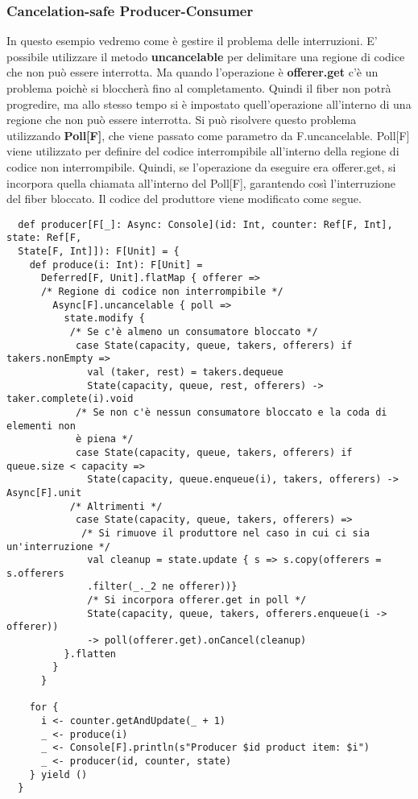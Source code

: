 \subsubsection{Cancelation-safe Producer-Consumer}
In questo esempio vedremo come è gestire il problema delle interruzioni. E' possibile utilizzare il metodo \textbf{uncancelable} per delimitare una regione di codice che non può essere interrotta. Ma quando l’operazione è \textbf{offerer.get} c’è un problema poichè si bloccherà fino al completamento. Quindi il fiber non potrà progredire, ma allo stesso tempo si è impostato quell’operazione all’interno di una regione che non può essere interrotta. Si può risolvere questo problema utilizzando \textbf{Poll[F]}, che viene passato come parametro da F.uncancelable. Poll[F] viene utilizzato per definire del codice interrompibile all’interno della regione di codice non interrompibile. Quindi, se l’operazione da
eseguire era offerer.get, si incorpora quella chiamata all’interno del Poll[F], garantendo così l’interruzione del fiber bloccato. Il codice del produttore viene modificato come segue.
\begin{verbatim}
  def producer[F[_]: Async: Console](id: Int, counter: Ref[F, Int], state: Ref[F, 
  State[F, Int]]): F[Unit] = {
    def produce(i: Int): F[Unit] =
      Deferred[F, Unit].flatMap { offerer =>
      /* Regione di codice non interrompibile */
        Async[F].uncancelable { poll =>
          state.modify {
           /* Se c'è almeno un consumatore bloccato */
            case State(capacity, queue, takers, offerers) if takers.nonEmpty =>
              val (taker, rest) = takers.dequeue
              State(capacity, queue, rest, offerers) -> taker.complete(i).void
            /* Se non c'è nessun consumatore bloccato e la coda di elementi non
            è piena */
            case State(capacity, queue, takers, offerers) if queue.size < capacity =>
              State(capacity, queue.enqueue(i), takers, offerers) -> Async[F].unit
           /* Altrimenti */
            case State(capacity, queue, takers, offerers) =>
             /* Si rimuove il produttore nel caso in cui ci sia un'interruzione */
              val cleanup = state.update { s => s.copy(offerers = s.offerers
              .filter(_._2 ne offerer))}
              /* Si incorpora offerer.get in poll */
              State(capacity, queue, takers, offerers.enqueue(i -> offerer)) 
              -> poll(offerer.get).onCancel(cleanup)
          }.flatten
        }
      }

    for {
      i <- counter.getAndUpdate(_ + 1) 
      _ <- produce(i)
      _ <- Console[F].println(s"Producer $id product item: $i")
      _ <- producer(id, counter, state)
    } yield ()
  }   
\end{verbatim}

